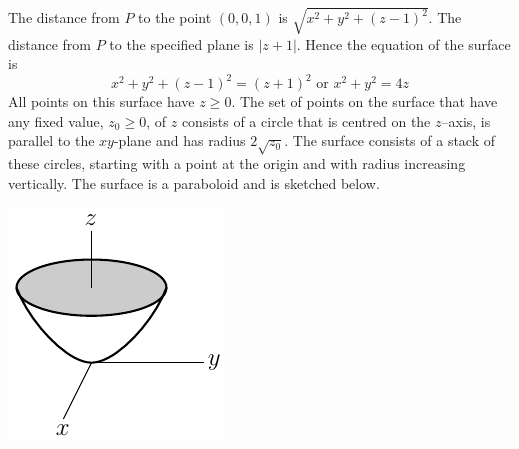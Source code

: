 \begin{solution}
The distance from $P$ to the point $(0,0,1)$ is $\sqrt{x^2+y^2+(z-1)^2}$.
The distance from $P$ to the specified plane is $|z+1|$. Hence the equation
of the surface is
\begin{equation*}
x^2+y^2+(z-1)^2=(z+1)^2\text{ or }
   x^2+y^2=4z
\end{equation*}
All points on this surface have $z\ge 0$. The set of points on the surface
that have any fixed value, $z_0\ge 0$, of $z$ consists of a circle that is
centred on the $z$--axis, is parallel to the $xy$-plane and has radius
$2\sqrt{z_0}$. The surface consists of a stack of these circles, starting
with a point at the origin and with radius increasing vertically. The surface
is a paraboloid and is sketched below.
\begin{center}
     \includegraphics{fig/OE01AQ1.pdf}
\end{center}
\end{solution}









